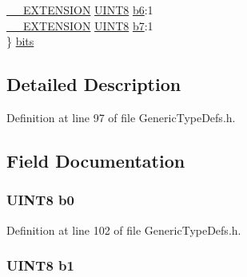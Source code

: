 \begin{DoxyCompactItemize}
\begin{tabbing}
\>\hyperlink{_generic_type_defs_8h_a6f634b0fdcc4febac630fc28e2685ddb}{\_\_EXTENSION} \hyperlink{_generic_type_defs_8h_ab27e9918b538ce9d8ca692479b375b6a}{UINT8} \hyperlink{union_u_i_n_t8___v_a_l_a6e2f92e230bd0de99eaf629e3773e0f3}{b6}:1\\
\>\hyperlink{_generic_type_defs_8h_a6f634b0fdcc4febac630fc28e2685ddb}{\_\_EXTENSION} \hyperlink{_generic_type_defs_8h_ab27e9918b538ce9d8ca692479b375b6a}{UINT8} \hyperlink{union_u_i_n_t8___v_a_l_a3ebca743ae92e60d1aee4011d025bd2a}{b7}:1\\
\} \hyperlink{union_u_i_n_t8___v_a_l_a7c38ea03f26603d6b2be5fced0ea3af0}{bits}\\

\end{tabbing}\end{DoxyCompactItemize}


\subsection{Detailed Description}


Definition at line 97 of file Generic\+Type\+Defs.\+h.



\subsection{Field Documentation}
\hypertarget{union_u_i_n_t8___v_a_l_a4074b3ee420d7782dce819fb031c29a2}{}
\subsubsection[{b0}]{ {\bf U\+I\+N\+T8} b0}\label{union_u_i_n_t8___v_a_l_a4074b3ee420d7782dce819fb031c29a2}


Definition at line 102 of file Generic\+Type\+Defs.\+h.

\hypertarget{union_u_i_n_t8___v_a_l_abd793f2202642a6be403e0532d5ad5ac}{}
\subsubsection[{b1}]{ {\bf U\+I\+N\+T8} b1}\label{union_u_i_n_t8___v_a_l_abd793f2202642a6be403e0532d5ad5ac}


